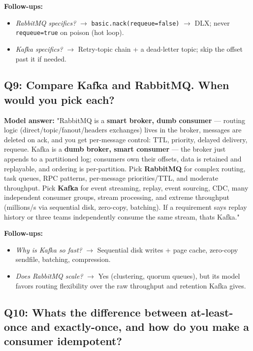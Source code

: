 \documentclass[11pt]{article}
\providecommand{\tightlist}{\setlength{\itemsep}{1pt}\setlength{\parskip}{0pt}}
\begin{document}
\textbf{Follow-ups:}

\begin{itemize}
\tightlist
\item
  \emph{RabbitMQ specifics?} \(\rightarrow\) \texttt{basic.nack(requeue=false)} \(\rightarrow\) DLX; never \texttt{requeue=true} on poison (hot loop).
\item
  \emph{Kafka specifics?} \(\rightarrow\) Retry-topic chain + a dead-letter topic; skip the offset past it if needed.
\end{itemize}

\subsection{Q9: Compare Kafka and RabbitMQ. When would you pick each?}\label{q9-compare-kafka-and-rabbitmq-when-would-you-pick-each}

\textbf{Model answer:} "RabbitMQ is a \textbf{smart broker, dumb consumer} --- routing logic (direct/topic/fanout/headers exchanges) lives in the broker, messages are deleted on ack, and you get per-message control: TTL, priority, delayed delivery, requeue. Kafka is a \textbf{dumb broker, smart consumer} --- the broker just appends to a partitioned log; consumers own their offsets, data is retained and replayable, and ordering is per-partition. Pick \textbf{RabbitMQ} for complex routing, task queues, RPC patterns, per-message priorities/TTL, and moderate throughput. Pick \textbf{Kafka} for event streaming, replay, event sourcing, CDC, many independent consumer groups, stream processing, and extreme throughput (millions/s via sequential disk, zero-copy, batching). If a requirement says \textquotesingle replay history\textquotesingle{} or \textquotesingle three teams independently consume the same stream,\textquotesingle{} that\textquotesingle s Kafka."

\textbf{Follow-ups:}

\begin{itemize}
\tightlist
\item
  \emph{Why is Kafka so fast?} \(\rightarrow\) Sequential disk writes + page cache, zero-copy sendfile, batching, compression.
\item
  \emph{Does RabbitMQ scale?} \(\rightarrow\) Yes (clustering, quorum queues), but its model favors routing flexibility over the raw throughput and retention Kafka gives.
\end{itemize}

\subsection{Q10: What\textquotesingle s the difference between at-least-once and exactly-once, and how do you make a consumer idempotent?}\label{q10-whats-the-difference-between-at-least-once-and-exactly-once-and-how-do-you-make-a-consumer-idempotent}
\end{document}
